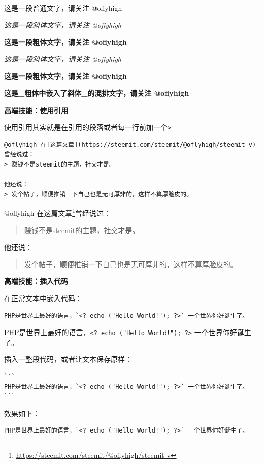 \documentclass[]{ctexbook}
\renewcommand{\href}[2]{#2\footnote{\url{#1}}}
\begin{document}
这是一段普通文字，请关注 @oflyhigh

\emph{这是一段斜体文字，请关注 @oflyhigh}

\textbf{这是一段粗体文字，请关注 @oflyhigh}

\emph{这是一段斜体文字，请关注 @oflyhigh}

\textbf{这是一段粗体文字，请关注 @oflyhigh}

\textbf{这是\_粗体中嵌入了斜体\_的混排文字，请关注 @oflyhigh}

\textbf{高端技能：使用引用}

使用引用其实就是在引用的段落或者每一行前加一个\texttt{\textgreater{}}

\begin{verbatim}
@oflyhigh 在[这篇文章](https://steemit.com/steemit/@oflyhigh/steemit-v)曾经说过：
> 赚钱不是steemit的主题，社交才是。

他还说：
> 发个帖子，顺便推销一下自己也是无可厚非的，这样不算厚脸皮的。
\end{verbatim}

@oflyhigh 在\href{https://steemit.com/steemit/@oflyhigh/steemit-v}{这篇文章}曾经说过：

\begin{quote}
赚钱不是steemit的主题，社交才是。
\end{quote}

他还说：

\begin{quote}
发个帖子，顺便推销一下自己也是无可厚非的，这样不算厚脸皮的。
\end{quote}

\textbf{高端技能：插入代码}

在正常文本中嵌入代码：

\begin{verbatim}
PHP是世界上最好的语言，`<? echo ("Hello World!"); ?>` 一个世界你好诞生了。
\end{verbatim}

PHP是世界上最好的语言，\texttt{\textless{}?\ echo\ ("Hello\ World!");\ ?\textgreater{}} 一个世界你好诞生了。

插入一整段代码，或者让文本保存原样：

\begin{verbatim}
```
PHP是世界上最好的语言，`<? echo ("Hello World!"); ?>` 一个世界你好诞生了。
```
\end{verbatim}

效果如下：

\begin{verbatim}
PHP是世界上最好的语言，`<? echo ("Hello World!"); ?>` 一个世界你好诞生了。
\end{verbatim}
\end{document}
